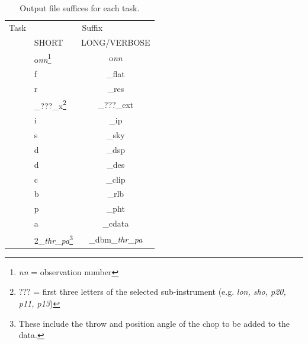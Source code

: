 \documentclass[twoside,11pt]{starlink}
\providecommand{\task}[1]{#1}
\providecommand{\chgdata}{\htmlref{\task{change\_data}}{CHANGE_DATA}}
\providecommand{\resw}{\htmlref{\task{reduce\_switch}}{REDUCE_SWITCH}}
\providecommand{\flatf}{\htmlref{\task{flatfield}}{FLATFIELD}}
\providecommand{\scuphot}{\htmlref{\task{scuphot}}{SCUPHOT}}
\providecommand{\ext}{\htmlref{\task{extinction}}{EXTINCTION}}
\providecommand{\remsky}{\htmlref{\task{remsky}}{REMSKY}}
\providecommand{\restore}{\htmlref{\task{restore}}{RESTORE}}
\providecommand{\despike}{\htmlref{\task{despike}}{DESPIKE}}
\providecommand{\despikeb}{\htmlref{\task{despike2}}{DESPIKE2}}
\providecommand{\scuclip}{\htmlref{\task{scuclip}}{SCUCLIP}}
\providecommand{\scanrlb}{\htmlref{\task{scan\_rlb}}{SCAN_RLB}}
\providecommand{\adddbm}{\htmlref{\task{add\_dbm}}{ADD_DBM}}
\providecommand{\remip}{\htmlref{\task{remip}}{REMIP}}
\begin{document}
\begin{table}
\begin{minipage}{\textwidth}
\caption{Output file suffices for each task.}
\label{tab_suffices}
\begin{center}
\begin{tabular}{llc}
\hline\hline
Task & \multicolumn{2}{c}{Suffix} \\ \cline{2-3}
     & SHORT & LONG/VERBOSE  \\ \hline

\resw   & o\textit{nn}\footnote{\textit{nn} = observation number} & o\textit{nn} \\
\flatf  & f   & \_flat \\
\restore& r   & \_res  \\
\ext    & \_???\_x\footnote{??? = first three letters of the selected
sub-instrument (e.g. \textit{lon, sho, p20, p11, p13})} & \_???\_ext\\
\remip  & i   & \_ip \\
\remsky & s   & \_sky \\
\despike & d  & \_dsp \\
\despikeb & d & \_des \\
\scuclip & c & \_clip \\
\scanrlb & b & \_rlb \\
\scuphot & p & \_pht \\
\chgdata & a  & \_cdata \\
\adddbm  & 2\_\textit{thr}\_\textit{pa}\footnote{These include the throw
and position angle of the chop to be added to the data.} & \_dbm\_\textit{thr}\_\textit{pa} \\

\hline\hline
\end{tabular}
\end{center}
\end{minipage}
\end{table}
\end{document}
